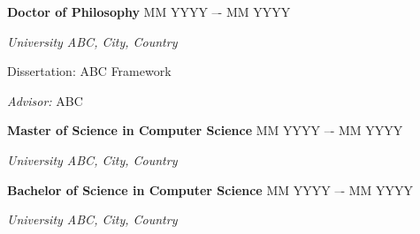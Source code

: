 {\textbf{Doctor of Philosophy} \hfill MM YYYY –- MM YYYY}

\textit{University ABC, City, Country}

Dissertation: ABC Framework

\textit{Advisor:} ABC


\vspace*{7pt}
{\textbf{Master of Science in Computer Science} \hfill MM YYYY –- MM YYYY}

\textit{University ABC, City, Country}

\vspace*{7pt}

{\textbf{Bachelor of Science in Computer Science} \hfill MM YYYY –- MM YYYY}

\textit{University ABC, City, Country}

